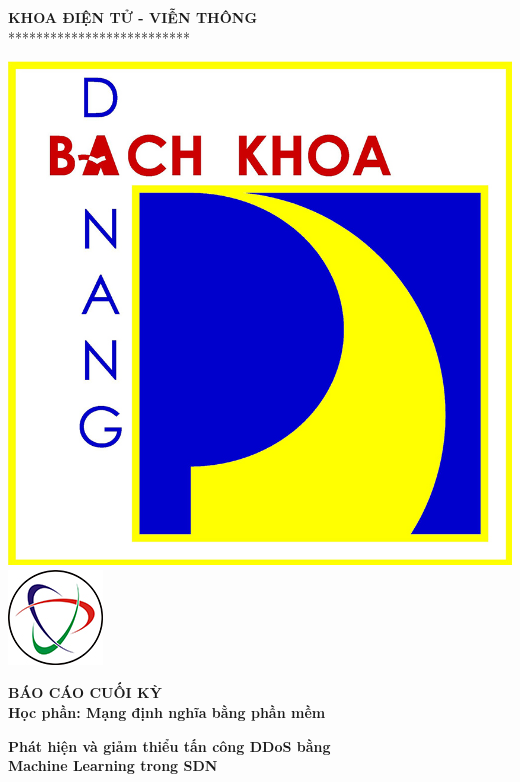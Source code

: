 \documentclass[a4paper]{article}
\begin{document}
\begin{titlepage}
\begin{center}
    \vspace{7pt}
    \textbf{KHOA ĐIỆN TỬ - VIỄN THÔNG} \\
    **************************
\end{center}
\vspace{10pt}
\begin{center}
    \includegraphics[scale=0.37]{images/logodut.jpg}
    \includegraphics[scale=0.75]{images/logoete.jpg}
    
    \vspace{20pt}
    \fontsize{17pt}{17pt}\selectfont 
    \textbf{BÁO CÁO CUỐI KỲ} \\
    \vspace{7pt}
    \textbf{Học phần: Mạng định nghĩa bằng phần mềm}
    \vspace{7pt}

\end{center}
\begin{flushleft}
    \fontsize{15pt}{10pt}\selectfont  
    \textbf{\textsl{}}
\end{flushleft}
\begin{center}
    \hspace{10pt}
    \fontsize{16pt}{16pt}\selectfont 
    \textbf{\textrm{Phát hiện và giảm thiểu tấn công DDoS bằng \\ Machine Learning trong SDN}}
\end{center}
\begin{center}
    \fontsize{16pt}{17pt}\selectfont 
    \textbf{\textrm{}}
\end{center}


\end{titlepage}
\end{document}
